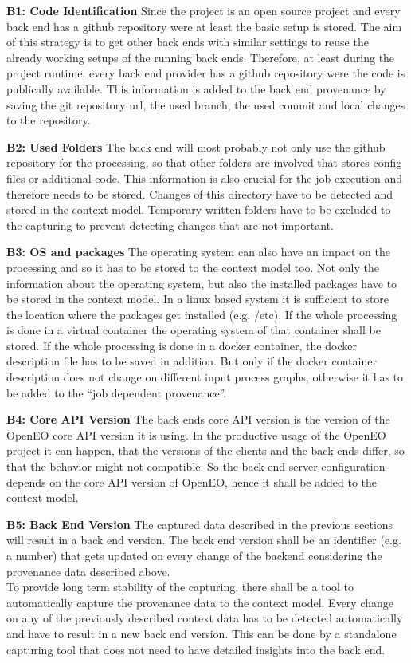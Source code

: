 \documentclass[draft,final]{vutinfth} %
\begin{document}
\textbf{B1: Code Identification}
Since the project is an open source project and every back end has a github repository were at least the basic setup is stored. The aim of this strategy is to get other back ends with similar settings to reuse the already working setups of the running back ends.  Therefore, at least during the project runtime, every back end provider has a github repository were the code is publically available. This information is added to the back end provenance by saving the git repository url, the used branch, the used commit and local changes to the repository.   

\textbf{B2: Used Folders}
The back end will most probably not only use the github repository for the processing, so that other folders are involved that stores config files or additional code. This information is also crucial for the job execution and therefore needs to be stored. Changes of this directory have to be detected and stored in the context model. Temporary written folders have to be excluded to the capturing to prevent detecting changes that are not important.    

\textbf{B3: OS and packages}
The operating system can also have an impact on the processing and so it has to be stored to the context model too. Not only the information about the operating system, but also the installed packages have to be stored in the context model. In a linux based system it is sufficient to store the location where the packages get installed (e.g. /etc). If the whole processing is done in a virtual container the operating system of that container shall be stored. If the whole processing is done in a docker container, the docker description file has to be saved in addition. But only if the docker container description does not change on different input process graphs, otherwise it has to be added to the “job dependent provenance”. 

\textbf{B4: Core API Version}
The back ends core API version is the version of the OpenEO core API version it is using. In the productive usage of the OpenEO project it can happen, that the versions of the clients and the back ends differ, so that the behavior might not compatible. So the back end server configuration depends on the core API version of OpenEO, hence it shall be added to the context model.

\textbf{B5: Back End Version}
The captured data described in the previous sections will result in a back end version. The back end version shall be an identifier (e.g. a number) that gets updated on every change of the backend considering the provenance data described above. 
\\
To  provide long term stability of the capturing, there shall be a tool to automatically capture the provenance data to the context model. Every change on any of the previously described context data has to be detected automatically and have to result in a new back end version. This can be done by a standalone capturing tool that does not need to have detailed insights into the back end. 
\end{document}
